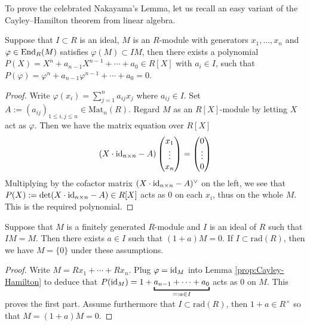 To prove the celebrated Nakayama's Lemma, let us recall an easy variant of the Cayley--Hamilton theorem from linear algebra.
\begin{lemma}\label{prop:Cayley-Hamilton}
	Suppose that $I \subset R$ is an ideal, $M$ is an $R$-module with generators $x_1, \ldots, x_n$ and $\varphi \in \operatorname{End}_R(M)$ satisfies $\varphi(M) \subset IM$, then there exists a polynomial $P(X) = X^n + a_{n-1} X^{n-1} + \cdots + a_0 \in R[X]$ with $a_i \in I$, such that $P(\varphi) = \varphi^n + a_{n-1} \varphi^{n-1} + \cdots + a_0 = 0$.
\end{lemma}
\begin{proof}
	Write $\varphi(x_i) = \sum_{j=1}^n a_{ij} x_j$ where $a_{ij} \in I$. Set $A := (a_{ij})_{1 \leq i,j \leq n} \in \text{Mat}_n(R)$. Regard $M$ as an $R[X]$-module by letting $X$ act as $\varphi$. Then we have the matrix equation over $R[X]$
	\[ (X \cdot \mathrm{id}_{n \times n} - A) \begin{pmatrix} x_1 \\ \vdots \\ x_n \end{pmatrix} = \begin{pmatrix} 0 \\ \vdots \\ 0 \end{pmatrix} \]
	Multiplying by the cofactor matrix $(X \cdot \mathrm{id}_{n \times n} - A)^\vee$ on the left, we see that $P(X) := \det(X \cdot \mathrm{id}_{n \times n} - A) \in R[X]$ acts as $0$ on each $x_i$, thus on the whole $M$. This is the required polynomial.
\end{proof}

\begin{theorem}\label{prop:NAK}
	Suppose that $M$ is a finitely generated $R$-module and $I$ is an ideal of $R$ such that $IM = M$. Then there exists $a \in I$ such that $(1+a)M=0$. If $I \subset \text{rad}(R)$, then we have $M = \{0\}$ under these assumptions.
\end{theorem}
\begin{proof}
	Write $M = Rx_1 + \cdots + Rx_n$. Plug $\varphi = \mathrm{id}_M$ into Lemma \ref{prop:Cayley-Hamilton} to deduce that $P(\identity_M) = 1 + \underbracket{a_{n-1} + \cdots + a_0}_{=: a \in I}$ acts as $0$ on $M$. This proves the first part. Assume furthermore that $I \subset \text{rad}(R)$, then $1+a \in R^\times$ so that $M = (1+a)M = 0$.
\end{proof}

